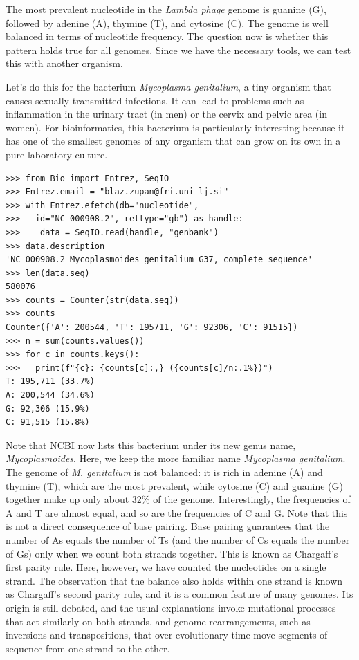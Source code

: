 The most prevalent nucleotide in the {\em Lambda phage} genome is guanine (G), followed by adenine (A), thymine (T), and cytosine (C). The genome is well balanced in terms of nucleotide frequency. The question now is whether this pattern holds true for all genomes. Since we have the necessary tools, we can test this with another organism.

Let's do this for the bacterium {\em Mycoplasma genitalium}, a tiny organism that causes sexually transmitted infections. It can lead to problems such as inflammation in the urinary tract (in men) or the cervix and pelvic area (in women). For bioinformatics, this bacterium is particularly interesting because it has one of the smallest genomes of any organism that can grow on its own in a pure laboratory culture.

\vspace*{3mm}
\begin{lstlisting}
>>> from Bio import Entrez, SeqIO
>>> Entrez.email = "blaz.zupan@fri.uni-lj.si"
>>> with Entrez.efetch(db="nucleotide", 
>>>   id="NC_000908.2", rettype="gb") as handle:
>>>    data = SeqIO.read(handle, "genbank")
>>> data.description
'NC_000908.2 Mycoplasmoides genitalium G37, complete sequence'
>>> len(data.seq)
580076
>>> counts = Counter(str(data.seq))
>>> counts
Counter({'A': 200544, 'T': 195711, 'G': 92306, 'C': 91515})
>>> n = sum(counts.values())
>>> for c in counts.keys():
>>>   print(f"{c}: {counts[c]:,} ({counts[c]/n:.1%})")
T: 195,711 (33.7%)
A: 200,544 (34.6%)
G: 92,306 (15.9%)
C: 91,515 (15.8%)
\end{lstlisting}

Note that NCBI now lists this bacterium under its new genus name, {\em Mycoplasmoides}. Here, we keep the more familiar name {\em Mycoplasma genitalium}. The genome of {\em M. genitalium} is not balanced: it is rich in adenine (A) and thymine (T), which are the most prevalent, while cytosine (C) and guanine (G) together make up only about 32\% of the genome. Interestingly, the frequencies of A and T are almost equal, and so are the frequencies of C and G. Note that this is not a direct consequence of base pairing. Base pairing guarantees that the number of As equals the number of Ts (and the number of Cs equals the number of Gs) only when we count both strands together. This is known as Chargaff's first parity rule. Here, however, we have counted the nucleotides on a single strand. The observation that the balance also holds within one strand is known as Chargaff's second parity rule, and it is a common feature of many genomes. Its origin is still debated, and the usual explanations invoke mutational processes that act similarly on both strands, and genome rearrangements, such as inversions and transpositions, that over evolutionary time move segments of sequence from one strand to the other.

